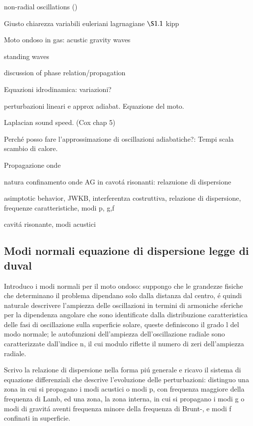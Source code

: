 \documentclass[../main.tex]{subfiles}
\begin{document}
\begin{itemize*}
\item non-radial oscillations  (\cite{han12stellar})
\item Giusto chiarezza variabili euleriani lagrnagiane $\S 1.1$ kipp

\item Moto ondoso in gas: acustic gravity waves
\item standing waves
\item discussion of phase relation/propagation
\item Equazioni idrodinamica: variazioni?
\item perturbazioni lineari e approx adiabat. Equazione del moto.
\item Laplacian sound speed. (Cox chap 5)
\item Perch\'e posso fare l'approssimazione di oscillazioni adiabatiche?: Tempi scala scambio di calore.
\item Propagazione onde \cite{tol63waves}
\item natura confinamento onde AG in cavot\'a risonanti: relazuione di dispersione

\item asimptotic behavior, JWKB, interferentza costruttiva, relazione di dispersione, frequenze caratteristiche, modi p, g,f
\item cavit\'a risonante, modi acustici
\end{itemize*}


\subsection{Modi normali equazione di dispersione legge di duval}
Introduco i modi normali per il moto ondoso: suppongo che le grandezze fisiche che determinano il problema dipendano solo dalla distanza dal centro, \'e quindi naturale descrivere l'ampiezza delle oscillazioni  in termini di armoniche sferiche per la dipendenza angolare che sono identificate dalla distribuzione caratteristica delle fasi di oscillazione sulla superficie solare, queste definiscono il grado l del modo normale; le autofunzioni dell'ampiezza dell'oscillazione radiale sono caratterizzate dall'indice n, il cui modulo riflette il numero di zeri dell'ampiezza radiale.

Scrivo la relazione di dispersione nella forma pi\'u generale e ricavo il sistema di equazione differenziali che descrive l'evoluzione delle perturbazioni: distinguo una zona in cui si propagano i modi acustici o modi p, con frequenza maggiore della frequenza di Lamb, ed una zona, la zona interna, in cui si propagano i modi g o modi di gravit\'a aventi frequenza minore della frequenza di Brunt-\vai{}, e modi f confinati in superficie. 
\end{document}
